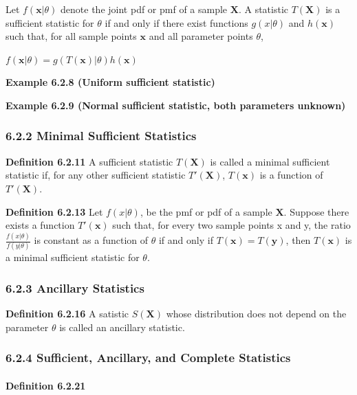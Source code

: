 \documentclass[6pt,twocolumn,Portrait]{article}
\let\oldparagraph\paragraph
\renewcommand{\paragraph}[1]{\oldparagraph{#1}\mbox{}}
\begin{document}
Let \(f(\mathbf{x}|\theta)\) denote the joint pdf or pmf of a sample
\(\mathbf{X}\). A statistic \(T(\mathbf{X})\) is a sufficient statistic
for \(\theta\) if and only if there exist functions \(g(x|\theta)\) and
\(h(\mathbf{x})\) such that, for all sample points \(\mathbf{x}\) and
all parameter points \(\theta\),

\(f(\mathbf{x}|\theta)= g(T(\mathbf{x})|\theta)h(\mathbf{x})\)

\textbf{Example 6.2.8 (Uniform sufficient statistic)}

\textbf{Example 6.2.9 (Normal sufficient statistic, both parameters
unknown)}

\hypertarget{minimal-sufficient-statistics}{%
\subsubsection{6.2.2 Minimal Sufficient
Statistics}\label{minimal-sufficient-statistics}}

\textbf{Definition 6.2.11} A sufficient statistic \(T(\mathbf{X})\) is
called a minimal sufficient statistic if, for any other sufficient
statistic \(T'(\mathbf{X})\), \(T(\mathbf{x})\) is a function of
\(T'(\mathbf{X})\).

\textbf{Definition 6.2.13} Let \(f(x|\theta)\), be the pmf or pdf of a
sample \(\mathbf{X}\). Suppose there exists a function
\(T'(\mathbf{x})\) such that, for every two sample points x and y, the
ratio \(\frac{f(x|\theta)}{f(y|\theta)}\) is constant as a function of
\(\theta\) if and only if \(T(\mathbf{x})=T(\mathbf{y})\), then
\(T(\mathbf{x})\) is a minimal sufficient statistic for \(\theta\).

\hypertarget{ancillary}{%
\subsubsection{6.2.3 Ancillary Statistics}\label{ancillary}}

\textbf{Definition 6.2.16} A satistic \(S(\mathbf{X})\) whose
distribution does not depend on the parameter \(\theta\) is called an
ancillary statistic.

\hypertarget{sufficient-ancillary-and-complete-statistics}{%
\subsubsection{6.2.4 Sufficient, Ancillary, and Complete
Statistics}\label{sufficient-ancillary-and-complete-statistics}}

\hypertarget{comp}{%
\paragraph{\texorpdfstring{\textbf{Definition
6.2.21}}{Definition 6.2.21}}\label{comp}}
\end{document}
